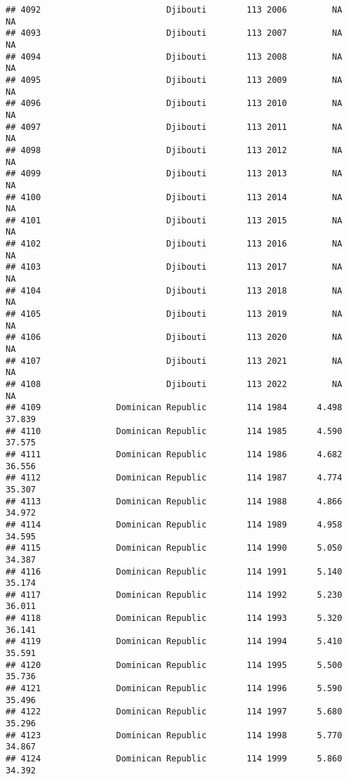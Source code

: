 \documentclass[
]{article}
\begin{document}
\begin{verbatim}
## 4092                         Djibouti        113 2006         NA         NA
## 4093                         Djibouti        113 2007         NA         NA
## 4094                         Djibouti        113 2008         NA         NA
## 4095                         Djibouti        113 2009         NA         NA
## 4096                         Djibouti        113 2010         NA         NA
## 4097                         Djibouti        113 2011         NA         NA
## 4098                         Djibouti        113 2012         NA         NA
## 4099                         Djibouti        113 2013         NA         NA
## 4100                         Djibouti        113 2014         NA         NA
## 4101                         Djibouti        113 2015         NA         NA
## 4102                         Djibouti        113 2016         NA         NA
## 4103                         Djibouti        113 2017         NA         NA
## 4104                         Djibouti        113 2018         NA         NA
## 4105                         Djibouti        113 2019         NA         NA
## 4106                         Djibouti        113 2020         NA         NA
## 4107                         Djibouti        113 2021         NA         NA
## 4108                         Djibouti        113 2022         NA         NA
## 4109               Dominican Republic        114 1984      4.498     37.839
## 4110               Dominican Republic        114 1985      4.590     37.575
## 4111               Dominican Republic        114 1986      4.682     36.556
## 4112               Dominican Republic        114 1987      4.774     35.307
## 4113               Dominican Republic        114 1988      4.866     34.972
## 4114               Dominican Republic        114 1989      4.958     34.595
## 4115               Dominican Republic        114 1990      5.050     34.387
## 4116               Dominican Republic        114 1991      5.140     35.174
## 4117               Dominican Republic        114 1992      5.230     36.011
## 4118               Dominican Republic        114 1993      5.320     36.141
## 4119               Dominican Republic        114 1994      5.410     35.591
## 4120               Dominican Republic        114 1995      5.500     35.736
## 4121               Dominican Republic        114 1996      5.590     35.496
## 4122               Dominican Republic        114 1997      5.680     35.296
## 4123               Dominican Republic        114 1998      5.770     34.867
## 4124               Dominican Republic        114 1999      5.860     34.392

\end{verbatim}
\end{document}

